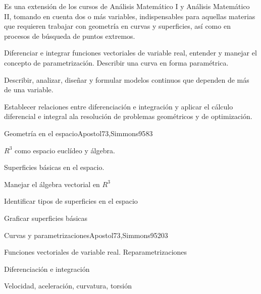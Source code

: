 
\begin{syllabus}


\begin{justification}
Es una extensión de los cursos de Análisis Matemático I y Análisis Matemático II, tomando en cuenta dos o más variables, indispensables para aquellas materias que requieren trabajar con geometría en curvas y superficies, así como en procesos de búsqueda de puntos extremos.
\end{justification}

\begin{goals}
\item Diferenciar e integrar funciones vectoriales de variable real, entender y manejar el concepto de parametrización. Describir una curva en forma paramétrica.
\item Describir, analizar, diseñar y formular modelos continuos que dependen de más de una variable.
\item Establecer relaciones entre diferenciación e integración y aplicar el cálculo diferencial e integral ala resolución de problemas geométricos y de optimización.
\end{goals}


\begin{unit}{Geometría en el espacio}{}{Apostol73,Simmons95}{8}{3}
   \begin{topics}
      \item $R^3$ como espacio euclídeo y álgebra.
      \item Superficies básicas en el espacio.
   \end{topics}

   \begin{learningoutcomes}
      \item Manejar el álgebra vectorial en $R^3$
      \item Identificar tipos de superficies en el espacio
      \item Graficar superficies básicas
      \end{learningoutcomes}
\end{unit}

\begin{unit}{Curvas y parametrizaciones}{}{Apostol73,Simmons95}{20}{3}
   \begin{topics}
      \item Funciones vectoriales de variable real. Reparametrizaciones
      \item Diferenciación e integración
      \item Velocidad, aceleración, curvatura, torsión
      \end{topics}


\end{unit}
\end{syllabus}
